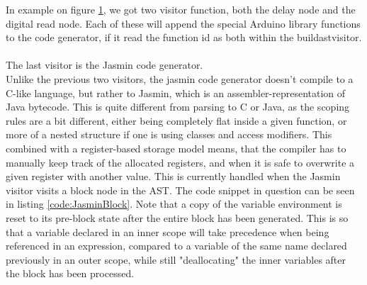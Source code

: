 \begin{figure}[H]
\centering
{}
\label{io02}
\end{figure}
In example on figure \ref{io02}, we got two visitor function, both the delay node and the digital read node. Each of these will append the special Arduino library functions to the code generator, if it read the function id as both within the buildastvisitor. \\
\\
The last visitor is the Jasmin code generator.\\
Unlike the previous two visitors, the jasmin code generator doesn't compile to a C-like language, but rather to Jasmin, which is an assembler-representation of Java bytecode. This is quite different from parsing to C or Java, as the scoping rules are a bit different, either being completely flat inside a given function, or more of a nested structure if one is using classes and access modifiers. This combined with a register-based storage model means, that the compiler has to manually keep track of the allocated registers, and when it is safe to overwrite a given register with another value. This is currently handled when the Jasmin visitor visits a block node in the AST. The code snippet in question can be seen in listing \ref{code:JasminBlock}. Note that a copy of the variable environment is reset to its pre-block state after the entire block has been generated. This is so that a variable declared in an inner scope will take precedence when being referenced in an expression, compared to a variable of the same name declared previously in an outer scope, while still "deallocating" the inner variables after the block has been processed.


